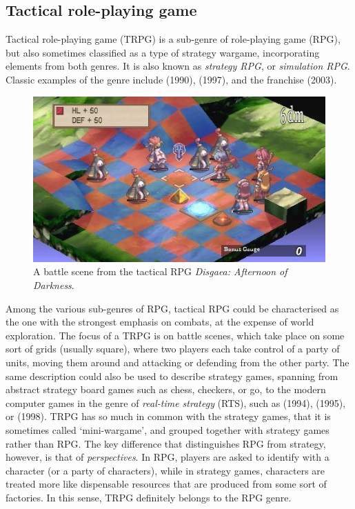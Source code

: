 \subsection{Tactical role-playing game}

Tactical role-playing game (TRPG) is a sub-genre of role-playing game (RPG)\cite{stenstrom2013understanding}, but also sometimes classified as a type of strategy wargame, incorporating elements from both genres. It is also known as \textit{strategy RPG}, or \textit{simulation RPG}.\cite{web-srpg} Classic examples of the genre include  (1990),  (1997), and the  franchise (2003)\cite{web-playingroles}.

\begin{figure}
	\centering
	\includegraphics[width=.7\linewidth]{figures/disgaea_aod.jpg}
	\caption{A battle scene from the tactical RPG \textit{Disgaea: Afternoon of Darkness}.}
\end{figure}

Among the various sub-genres of RPG, tactical RPG could be characterised as the one with the strongest emphasis on combats, at the expense of world exploration.\cite{stenstrom2013understanding} The focus of a TRPG is on battle scenes, which take place on some sort of grids (usually square), where two players each take control of a party of units, moving them around and attacking or defending from the other party. The same description could also be used to describe strategy games, spanning from abstract strategy board games such as chess, checkers, or go, to the modern computer games in the genre of \textit{real-time strategy} (RTS), such as  (1994),  (1995), or  (1998). TRPG has so much in common with the strategy games, that it is sometimes called `mini-wargame', and grouped together with strategy games rather than RPG.\cite[92, 108]{moore2011basics} The key difference that distinguishes RPG from strategy, however, is that of \textit{perspectives}. In RPG, players are asked to identify with a character (or a party of characters), while in strategy games, characters are treated more like dispensable resources that are produced from some sort of factories.\cites[8]{barton2008dungeons}[455]{adams2010fundamentals} In this sense, TRPG definitely belongs to the RPG genre.

